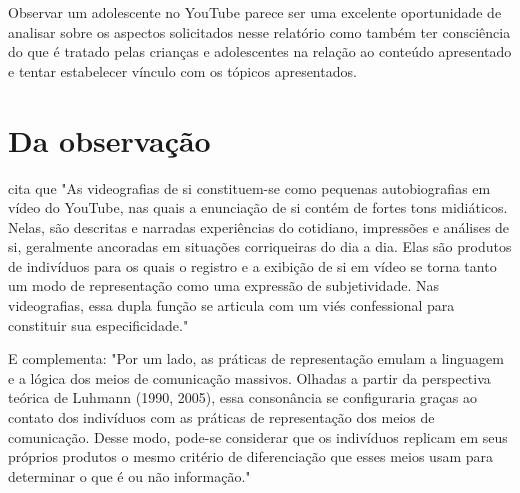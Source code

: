 Observar um adolescente no YouTube parece ser uma excelente oportunidade de analisar sobre os aspectos solicitados nesse relatório como também ter consciência do que é tratado pelas crianças e adolescentes na relação ao conteúdo apresentado e tentar estabelecer vínculo com os tópicos apresentados.

\section{Da observação}

 cita que "As videografias de si constituem-se como pequenas autobiografias em vídeo do
YouTube, nas quais a enunciação de si contém de fortes tons midiáticos. Nelas, são descritas e
narradas experiências do cotidiano, impressões e análises de si, geralmente ancoradas em situações
corriqueiras do dia a dia. Elas são produtos de indivíduos para os quais o registro e a exibição de si
em vídeo se torna tanto um modo de representação como uma expressão de subjetividade. Nas
videografias, essa dupla função se articula com um viés confessional para constituir sua
especificidade."

E complementa: "Por um lado, as práticas de representação emulam a linguagem e a lógica dos meios
de comunicação massivos. Olhadas a partir da perspectiva teórica de Luhmann (1990, 2005), essa
consonância se configuraria graças ao contato dos indivíduos com as práticas de representação dos
meios de comunicação. Desse modo, pode-se considerar que os indivíduos replicam em seus
próprios produtos o mesmo critério de diferenciação que esses meios usam para determinar o que é
ou não informação."